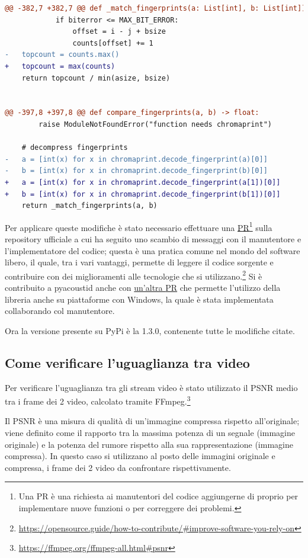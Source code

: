 \begin{lstlisting}[language=diff]
@@ -382,7 +382,7 @@ def _match_fingerprints(a: List[int], b: List[int]) -> float:
            if biterror <= MAX_BIT_ERROR:
                offset = i - j + bsize
                counts[offset] += 1
-   topcount = counts.max()
+   topcount = max(counts)
    return topcount / min(asize, bsize)


@@ -397,8 +397,8 @@ def compare_fingerprints(a, b) -> float:
        raise ModuleNotFoundError("function needs chromaprint")

    # decompress fingerprints
-   a = [int(x) for x in chromaprint.decode_fingerprint(a)[0]]
-   b = [int(x) for x in chromaprint.decode_fingerprint(b)[0]]
+   a = [int(x) for x in chromaprint.decode_fingerprint(a[1])[0]]
+   b = [int(x) for x in chromaprint.decode_fingerprint(b[1])[0]]
    return _match_fingerprints(a, b)
\end{lstlisting}

Per applicare queste modifiche è stato necessario effettuare una \href{https://github.com/beetbox/pyacoustid/pull/78}{\ac{PR}}\footnote{Una \ac{PR} è una richiesta ai manutentori del codice aggiungerne di proprio per implementare nuove funzioni o per correggere dei problemi.} sulla repository ufficiale a cui ha seguito uno scambio di messaggi con il manutentore e l'implementatore del codice; questa è una pratica comune nel mondo del software libero, il quale, tra i vari vantaggi, permette di leggere il codice sorgente e contribuire con dei miglioramenti alle tecnologie che si utilizzano.\footnote{\url{https://opensource.guide/how-to-contribute/#improve-software-you-rely-on}}
Si è contribuito a pyacoustid anche con \href{https://github.com/beetbox/pyacoustid/pull/79}{un'altra \ac{PR}} che permette l'utilizzo della libreria anche su piattaforme con Windows, la quale è stata implementata collaborando col manutentore.

Ora la versione presente su PyPi è la 1.3.0, contenente tutte le modifiche citate.


\subsection{Come verificare l'uguaglianza tra video} \label{ssec:packager-video}    %
Per verificare l'uguaglianza tra gli stream video è stato utilizzato il \ac{PSNR} medio tra i frame dei 2 video, calcolato tramite FFmpeg.\footnote{\url{https://ffmpeg.org/ffmpeg-all.html#psnr}}

Il \ac{PSNR} è una misura di qualità di un'immagine compressa rispetto all'originale; viene definito come il rapporto tra la massima potenza di un segnale (immagine originale) e la potenza del rumore rispetto alla sua rappresentazione (immagine compressa).
In questo caso si utilizzano al posto delle immagini originale e compressa, i frame dei 2 video da confrontare rispettivamente.

